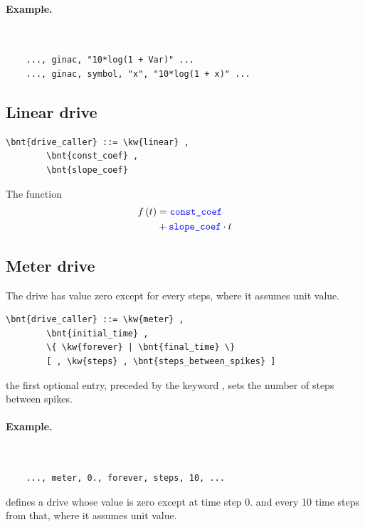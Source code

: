 \paragraph{Example.} \
\begin{verbatim}
    ..., ginac, "10*log(1 + Var)" ...
    ..., ginac, symbol, "x", "10*log(1 + x)" ...
\end{verbatim}

\subsection{Linear drive}\label{sec:DRIVE:LINEAR}
\begin{Verbatim}[commandchars=\\\{\}]
    \bnt{drive_caller} ::= \kw{linear} ,
        \bnt{const_coef} ,
        \bnt{slope_coef}
\end{Verbatim}
The function
\begin{align}
	f\left( t \right) &= \textcolor{blue}{\texttt{const\_coef}} \nonumber \\
		&+ \textcolor{blue}{\texttt{slope\_coef}} \cdot t
\end{align}

\subsection{Meter drive}
The  drive has value zero except for every  steps,
where it assumes unit value.
\begin{Verbatim}[commandchars=\\\{\}]
    \bnt{drive_caller} ::= \kw{meter} ,
        \bnt{initial_time} ,
        \{ \kw{forever} | \bnt{final_time} \}
        [ , \kw{steps} , \bnt{steps_between_spikes} ]
\end{Verbatim}
the first optional entry, preceded by the keyword , sets the
number of steps between spikes.

\paragraph{Example.} \
\begin{verbatim}
    ..., meter, 0., forever, steps, 10, ...
\end{verbatim}
defines a drive whose value is zero except at time step 0. 
and every 10 time steps from that, where it assumes unit value.

